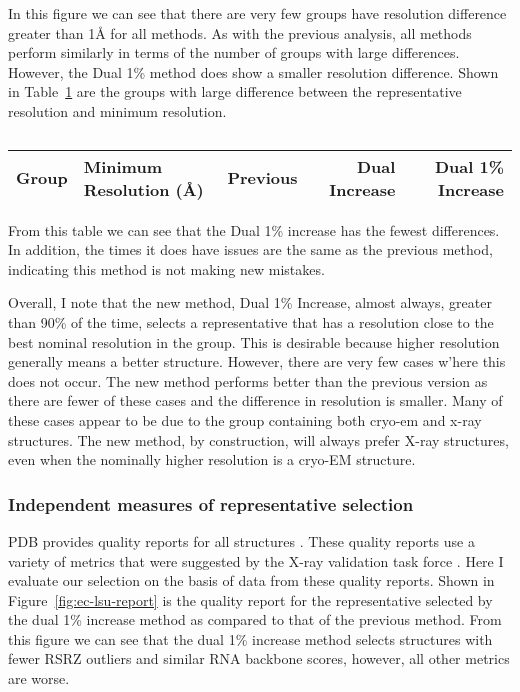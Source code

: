 \begin{figure}
  \caption{}
  \label{fig:xray-only-diff}
\end{figure}

In this figure we can see that there are very few groups have resolution
difference greater than 1\AA{} for all methods. As with the previous analysis, all
methods perform similarly in terms of the number of groups with large
differences. However, the Dual 1\% method does show a smaller resolution
difference. Shown in Table~\ref{tab:xray-only-outliers} are the groups with large
difference between the representative resolution and minimum resolution.

\begin{table}
  \begin{tabular}{llrrr}
    \toprule
    Group &  Minimum Resolution ({\AA}) &  Previous &  Dual Increase  & Dual 1\% Increase \\
    \midrule
    \bottomrule
  \end{tabular}
  \caption{}
  \label{tab:xray-only-outliers}
\end{table}

From this table we can see that the Dual 1\% increase has the fewest differences.
In addition, the times it does have issues are the same as the previous method,
indicating this method is not making new mistakes.

Overall, I note that the new method, Dual 1\% Increase, almost always, greater
than 90\% of the time, selects a representative that has a resolution close to
the best nominal resolution in the group. This is desirable because higher
resolution generally means a better structure. However, there are very few cases
w’here this does not occur. The new method performs better than the previous
version as there are fewer of these cases and the difference in resolution is
smaller. Many of these cases appear to be due to the group containing both
cryo-em and x-ray structures. The new method, by construction, will always
prefer X-ray structures, even when the nominally higher resolution is a cryo-EM
structure.

\subsubsection{Independent measures of representative selection}

PDB provides quality reports for all structures \cite{Gore2012}. These quality
reports use a variety of metrics that were suggested by the X-ray validation
task force \cite{Gore2012}. Here I evaluate our selection on the basis of data
from these quality reports. Shown in Figure~\ref{fig:ec-lsu-report} is the
quality report for the representative selected by the dual 1\% increase method
as compared to that of the previous method. From this figure we can see that the
dual 1\% increase method selects structures with fewer RSRZ outliers and similar
RNA backbone scores, however, all other metrics are worse.

